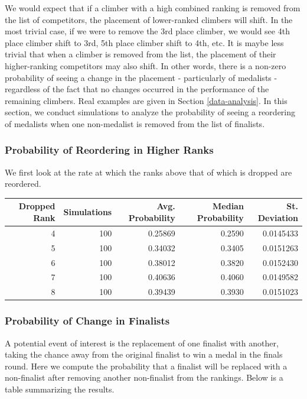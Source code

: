 \documentclass[12pt]{article}
\begin{document}
We would expect that if a climber with a high combined ranking is
removed from the list of competitors, the placement of lower-ranked
climbers will shift. In the most trivial case, if we were to remove the
3rd place climber, we would see 4th place climber shift to 3rd, 5th
place climber shift to 4th, etc. It is maybe less trivial that when a
climber is removed from the list, the placement of their higher-ranking
competitors may also shift. In other words, there is a non-zero
probability of seeing a change in the placement - particularly of
medalists - regardless of the fact that no changes occurred in the
performance of the remaining climbers. Real examples are given in
Section \ref{data-analysis}. In this section, we conduct simulations to
analyze the probability of seeing a reordering of medalists when one
non-medalist is removed from the list of finalists.

\hypertarget{probability-of-reordering-in-higher-ranks}{%
\subsubsection{Probability of Reordering in Higher
Ranks}\label{probability-of-reordering-in-higher-ranks}}

We first look at the rate at which the ranks above that of which is
dropped are reordered.

\begin{tabular}{r|r|r|r|r}
\hline
Dropped Rank & Simulations & Avg. Probability & Median Probability & St. Deviation\\
\hline
4 & 100 & 0.25869 & 0.2590 & 0.0145433\\
\hline
5 & 100 & 0.34032 & 0.3405 & 0.0151263\\
\hline
6 & 100 & 0.38012 & 0.3820 & 0.0152430\\
\hline
7 & 100 & 0.40636 & 0.4060 & 0.0149582\\
\hline
8 & 100 & 0.39439 & 0.3930 & 0.0151023\\
\hline
\end{tabular}

\hypertarget{probability-of-change-in-finalists}{%
\subsubsection{Probability of Change in
Finalists}\label{probability-of-change-in-finalists}}

A potential event of interest is the replacement of one finalist with
another, taking the chance away from the original finalist to win a
medal in the finals round. Here we compute the probability that a
finalist will be replaced with a non-finalist after removing another
non-finalist from the rankings. Below is a table summarizing the
results.
\end{document}

